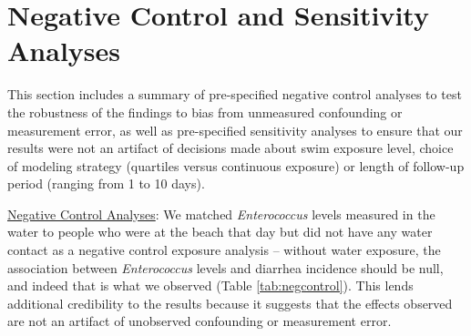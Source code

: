 \documentclass[12pt]{article}\usepackage[]{graphicx}\usepackage[]{color}
\begin{document}
\clearpage
\setcounter{table}{0}
\setcounter{figure}{0}
\section{Negative Control and Sensitivity Analyses}

This section includes a summary of pre-specified negative control analyses to test the robustness of the findings to bias from unmeasured confounding or measurement error, as well as pre-specified sensitivity analyses to ensure that our results were not an artifact of decisions made about swim exposure level, choice of modeling strategy (quartiles versus continuous exposure) or length of follow-up period (ranging from 1 to 10 days).

\bigskip
\underline{Negative Control Analyses}: We matched \emph{Enterococcus} levels measured in the water to people who were at the beach that day but did not have any water contact as a negative control exposure analysis\supercite{Lipsitch2010-kq,Arnold2016-yr} -- without water exposure, the association between \emph{Enterococcus} levels and diarrhea incidence should be null, and indeed that is what we observed (Table \ref{tab:negcontrol}). This lends additional credibility to the results because it suggests that the effects observed are not an artifact of unobserved confounding or measurement error.\supercite{Lipsitch2010-kq,Arnold2016-yr}
\end{document}
